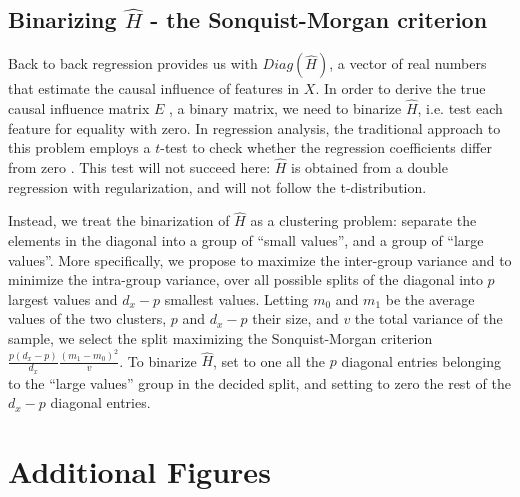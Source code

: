 \subsection{Binarizing $\hat{H}$ - the Sonquist-Morgan criterion}

Back to back regression provides us with $Diag(\hat{H})$, a vector of real numbers that estimate the causal influence of features in $X$. In order to derive the true causal influence matrix $E$ , a binary matrix, we need to binarize  $\hat{H}$, i.e. test each feature for equality with zero. In regression analysis, the traditional approach to this problem employs a $t$-test to check whether the regression coefficients differ from zero \citep{student1908probable}. This test will not succeed here: $\hat{H}$ is obtained from a double regression with regularization, and will not follow the t-distribution.

Instead, we treat the binarization of $\hat{H}$ as a clustering problem: separate the elements in the diagonal into a group of ``small values'', and a group of ``large values''. More specifically, we propose to maximize the inter-group variance and to minimize the intra-group variance, over all possible splits of the diagonal into $p$ largest values and $d_x-p$ smallest values.
%
Letting $m_0$ and $m_1$ be the average values of the two clusters, $p$ and $d_x-p$ their size, and $v$ the total variance of the sample, we select the split maximizing the Sonquist-Morgan \citep{sonquist_morgan} \citep{kass75} criterion $\frac{p(d_x-p)}{d_x} \frac{(m_1 - m_0)^2}{v}$.
%
To binarize $\hat{H}$, set to one all the $p$ diagonal entries belonging to the ``large values'' group in the decided split, and setting to zero the rest of the $d_x-p$ diagonal entries.


\section{Additional Figures}




